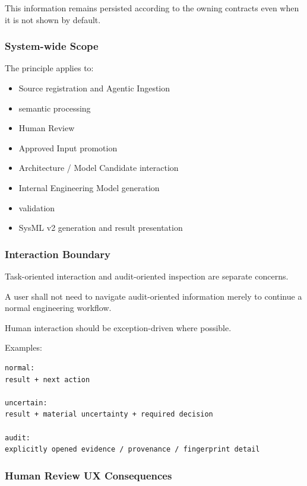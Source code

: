 This information remains persisted according to the owning contracts even when it is not shown by default.

\hypertarget{system-wide-scope}{%
\subsubsection{System-wide Scope}\label{system-wide-scope}}

The principle applies to:

\begin{itemize}
\tightlist
\item
  Source registration and Agentic Ingestion
\item
  semantic processing
\item
  Human Review
\item
  Approved Input promotion
\item
  Architecture / Model Candidate interaction
\item
  Internal Engineering Model generation
\item
  validation
\item
  SysML v2 generation and result presentation
\end{itemize}

\hypertarget{interaction-boundary}{%
\subsubsection{Interaction Boundary}\label{interaction-boundary}}

Task-oriented interaction and audit-oriented inspection are separate concerns.

A user shall not need to navigate audit-oriented information merely to continue a normal engineering workflow.

Human interaction should be exception-driven where possible.

Examples:

\begin{verbatim}
normal:
result + next action

uncertain:
result + material uncertainty + required decision

audit:
explicitly opened evidence / provenance / fingerprint detail
\end{verbatim}

\hypertarget{human-review-ux-consequences}{%
\subsubsection{Human Review UX Consequences}\label{human-review-ux-consequences}}

